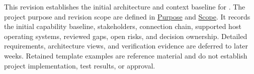 This revision establishes the initial architecture and context baseline for
\ProjectName. The project purpose and revision scope are defined in
\hyperref[Section:ProjectPurpose]{Purpose} and
\hyperref[Section:ProjectScope]{Scope}. It records the initial capability
baseline, stakeholders, connection chain, supported host operating systems,
reviewed gaps, open risks, and decision ownership. Detailed requirements,
architecture views, and verification evidence are deferred to later weeks.
Retained template examples are reference material and do not establish
project implementation, test results, or approval.
